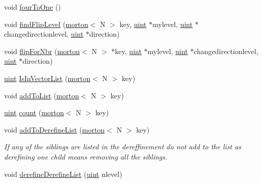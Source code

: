 \begin{DoxyCompactItemize}
\item 
void \mbox{\hyperlink{classTree_a645682dbe12c75b89752e94b4c13faa4}{four\+To\+One}} ()
\item 
void \mbox{\hyperlink{classTree_a272d3af67b3ab350755281bba8d4e18c}{find\+Flip\+Level}} (\mbox{\hyperlink{definitions_8h_af8682350bd8bb38ee9023f7a0a310add}{morton}}$<$ N $>$ key, \mbox{\hyperlink{definitions_8h_a69aa29b598b851b0640aa225a9e5d61d}{uint}} $\ast$mylevel, \mbox{\hyperlink{definitions_8h_a69aa29b598b851b0640aa225a9e5d61d}{uint}} $\ast$changedirectionlevel, \mbox{\hyperlink{definitions_8h_a69aa29b598b851b0640aa225a9e5d61d}{uint}} $\ast$direction)
\item 
void \mbox{\hyperlink{classTree_add6b161eec89fc2a372f3e2f46862a98}{flip\+For\+Nbr}} (\mbox{\hyperlink{definitions_8h_af8682350bd8bb38ee9023f7a0a310add}{morton}}$<$ N $>$ $\ast$key, \mbox{\hyperlink{definitions_8h_a69aa29b598b851b0640aa225a9e5d61d}{uint}} $\ast$mylevel, \mbox{\hyperlink{definitions_8h_a69aa29b598b851b0640aa225a9e5d61d}{uint}} $\ast$changedirectionlevel, \mbox{\hyperlink{definitions_8h_a69aa29b598b851b0640aa225a9e5d61d}{uint}} $\ast$direction)
\item 
\mbox{\hyperlink{definitions_8h_a69aa29b598b851b0640aa225a9e5d61d}{uint}} \mbox{\hyperlink{classTree_a4bc3620d378608937e528270745f435e}{Is\+In\+Vector\+List}} (\mbox{\hyperlink{definitions_8h_af8682350bd8bb38ee9023f7a0a310add}{morton}}$<$ N $>$ key)
\item 
void \mbox{\hyperlink{classTree_a87d766216a59c8c77207f0fa2d093676}{add\+To\+List}} (\mbox{\hyperlink{definitions_8h_af8682350bd8bb38ee9023f7a0a310add}{morton}}$<$ N $>$ key)
\item 
\mbox{\hyperlink{definitions_8h_a69aa29b598b851b0640aa225a9e5d61d}{uint}} \mbox{\hyperlink{classTree_a5304383e6a6fea724e6ad4c8f5c4b754}{count}} (\mbox{\hyperlink{definitions_8h_af8682350bd8bb38ee9023f7a0a310add}{morton}}$<$ N $>$ key)
\item 
void \mbox{\hyperlink{classTree_a4527b5986587bad066e10ea733c1bc95}{add\+To\+Derefine\+List}} (\mbox{\hyperlink{definitions_8h_af8682350bd8bb38ee9023f7a0a310add}{morton}}$<$ N $>$ key)
\begin{DoxyCompactList}\small\item\em If any of the siblings are listed in the dereffinement do not add to the list as derefining one child means removing all the siblings. \end{DoxyCompactList}\item 
void \mbox{\hyperlink{classTree_a09d2a574f82bfd4e8f7974a6a3fda540}{derefine\+Derefine\+List}} (\mbox{\hyperlink{definitions_8h_a69aa29b598b851b0640aa225a9e5d61d}{uint}} nlevel)

\end{DoxyCompactItemize}
